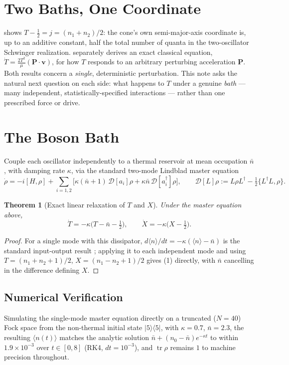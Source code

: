 \documentclass[12pt]{amsart}
\theoremstyle{plain}
\newtheorem{theorem}{Theorem}[section]
\theoremstyle{remark}
\begin{document}
\section{Two Baths, One Coordinate}

\cite{Ebert2026Quantum} shows $T-\tfrac12=j=(n_1+n_2)/2$: the cone's own semi-major-axis coordinate is, up to an additive constant, half the total number of quanta in the two-oscillator Schwinger realization. \cite{Ebert2026LeviCivita} separately derives an exact classical equation, $\dot T=\frac{2T^2}{\mu}(\mathbf P\cdot\mathbf v)$, for how $T$ responds to an arbitrary perturbing acceleration $\mathbf P$. Both results concern a \emph{single}, deterministic perturbation. This note asks the natural next question on each side: what happens to $T$ under a genuine \emph{bath} --- many independent, statistically-specified interactions --- rather than one prescribed force or drive.

\section{The Boson Bath}

Couple each oscillator independently to a thermal reservoir at mean occupation $\bar n$, with damping rate $\kappa$, via the standard two-mode Lindblad master equation
\[
\dot\rho = -i[H,\rho] + \sum_{i=1,2}\Big[\kappa(\bar n+1)\,\mathcal D[a_i]\rho + \kappa\bar n\,\mathcal D[a_i^\dagger]\rho\Big], \qquad \mathcal D[L]\rho:=L\rho L^\dagger-\tfrac12\{L^\dagger L,\rho\}.
\]

\begin{theorem}[Exact linear relaxation of $T$ and $X$]\label{thm:relax}
Under the master equation above,
\begin{equation}
\dot T = -\kappa\Big(T-\bar n-\tfrac12\Big), \qquad \dot X=-\kappa\Big(X-\tfrac12\Big). \tag{1}
\end{equation}
\end{theorem}

\begin{proof}
For a single mode with this dissipator, $d\langle n\rangle/dt=-\kappa(\langle n\rangle-\bar n)$ is the standard input-output result \cite{GardinerZoller2004}; applying it to each independent mode and using $T=(n_1+n_2+1)/2$, $X=(n_1-n_2+1)/2$ gives (1) directly, with $\bar n$ cancelling in the difference defining $X$.
\end{proof}

\subsection*{Numerical Verification}
Simulating the single-mode master equation directly on a truncated ($N=40$) Fock space from the non-thermal initial state $|5\rangle\langle5|$, with $\kappa=0.7$, $\bar n=2.3$, the resulting $\langle n(t)\rangle$ matches the analytic solution $\bar n+(n_0-\bar n)e^{-\kappa t}$ to within $1.9\times10^{-3}$ over $t\in[0,8]$ (RK4, $dt=10^{-3}$), and $\operatorname{tr}\rho$ remains $1$ to machine precision throughout.
\end{document}
